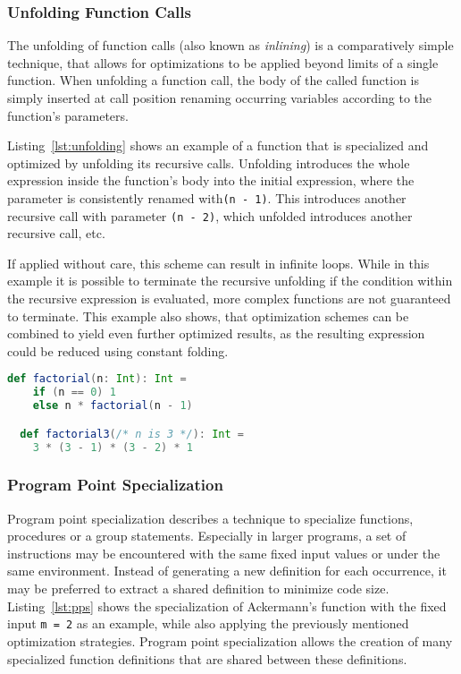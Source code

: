 \subsubsection*{Unfolding Function Calls}

The unfolding of function calls (also known as \textit{inlining}) is a comparatively simple technique, that allows for optimizations to be applied beyond limits of a single function.
When unfolding a function call, the body of the called function is simply inserted at call position renaming occurring variables according to the function's parameters.

Listing~\ref{lst:unfolding} shows an example of a function that is specialized and optimized by unfolding its recursive calls.
Unfolding introduces the whole expression inside the function's body into the initial expression, where the parameter is consistently renamed with\linebreak \texttt{(n - 1)}.
This introduces another recursive call with parameter \texttt{(n - 2)}, which unfolded introduces another recursive call, etc.

If applied without care, this scheme can result in infinite loops.
While in this example it is possible to terminate the recursive unfolding if the condition within the recursive expression is evaluated, more complex functions are not guaranteed to terminate.
This example also shows, that optimization schemes can be combined to yield even further optimized results, as the resulting expression could be reduced using constant folding.

\newpage

\begin{lstlisting}[language=scala,caption={Definition of the \texttt{factorial} function and its specialization.},label={lst:unfolding}]
  def factorial(n: Int): Int =
    if (n == 0) 1
    else n * factorial(n - 1)

  def factorial3(/* n is 3 */): Int =
    3 * (3 - 1) * (3 - 2) * 1
\end{lstlisting}


\subsubsection*{Program Point Specialization}

Program point specialization describes a technique to specialize functions, procedures or a group statements.
Especially in larger programs, a set of instructions may be encountered with the same fixed input values or under the same environment.
Instead of generating a new definition for each occurrence, it may be preferred to extract a shared definition to minimize code size.
Listing~\ref{lst:pps} shows the specialization of Ackermann's function with the fixed input \texttt{m = 2} as an example, while also applying the previously mentioned optimization strategies.
Program point specialization allows the creation of many specialized function definitions that are shared between these definitions.

